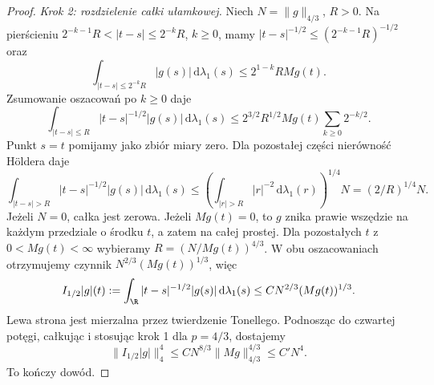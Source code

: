 \begin{proof}
\emph{Krok 2: rozdzielenie całki ułamkowej.}
Niech $N=\|g\|_{4/3}$, $R>0$. Na pierścieniu
$2^{-k-1}R<|t-s|\le2^{-k}R$, $k\ge0$, mamy
$|t-s|^{-1/2}\le(2^{-k-1}R)^{-1/2}$ oraz
\[
 \int_{|t-s|\le2^{-k}R}|g(s)|\,\mathrm d\lambda_1(s)
 \le 2^{1-k}R Mg(t).
\]
Zsumowanie oszacowań po $k\ge0$ daje
\[
 \int_{|t-s|\le R}|t-s|^{-1/2}|g(s)|\,\mathrm d\lambda_1(s)
 \le 2^{3/2}R^{1/2}Mg(t)\sum_{k\ge0}2^{-k/2}.
\]
Punkt $s=t$ pomijamy jako zbiór miary zero.
Dla pozostałej części nierówność H\"oldera daje
\[
 \int_{|t-s|>R}|t-s|^{-1/2}|g(s)|\,\mathrm d\lambda_1(s)
 \le \left(\int_{|r|>R}|r|^{-2}\,\mathrm d\lambda_1(r)\right)^{1/4}N
 = (2/R)^{1/4}N .
\]
Jeżeli $N=0$, całka jest zerowa. Jeżeli $Mg(t)=0$,
to $g$ znika prawie wszędzie na każdym przedziale
o środku $t$, a zatem na całej prostej.
Dla pozostałych $t$ z $0<Mg(t)<\infty$ wybieramy
$R=(N/Mg(t))^{4/3}$.
W obu oszacowaniach otrzymujemy czynnik
$N^{2/3}(Mg(t))^{1/3}$, więc
\[
 I_{1/2}|g|(t):=\int_\R |t-s|^{-1/2}|g(s)|\,\mathrm d\lambda_1(s)
 \le C N^{2/3}(Mg(t))^{1/3}.
\]
Lewa strona jest mierzalna przez twierdzenie
Tonellego. Podnosząc do czwartej potęgi,
całkując i stosując krok 1 dla $p=4/3$, dostajemy
\[
 \|I_{1/2}|g|\|_4^4
 \le C N^{8/3}\|Mg\|_{4/3}^{4/3}
 \le C' N^4.
\]
To kończy dowód.
\end{proof}

